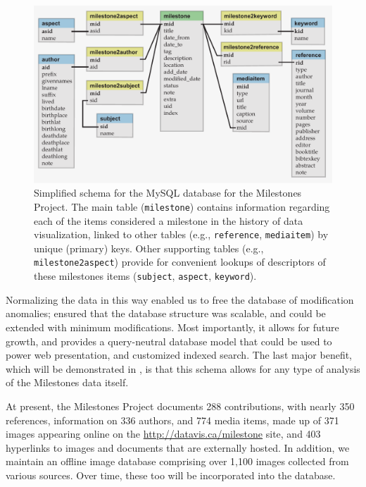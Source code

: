 \begin{figure}[!htb]
  \centering
  \includegraphics[width=\textwidth,clip]{fig/datavis-schema-3}
  \caption{Simplified schema for the MySQL database for the Milestones Project. 
  The main table (\texttt{milestone}) contains information regarding each of the items 
  considered a milestone in the history of data visualization, linked to other 
  tables (e.g., \texttt{reference}, \texttt{mediaitem}) by unique (primary) keys. 
  Other supporting tables (e.g., \texttt{milestone2aspect}) provide for 
  convenient lookups of descriptors of these milestones items (\texttt{subject}, 
  \texttt{aspect}, \texttt{keyword}).
  }
  \label{fig:datavis-schema-2}
\end{figure}

Normalizing the data in this way enabled us to free the database of 
modification anomalies; ensured that the database structure was scalable, and 
could be extended with minimum modifications. 
Most importantly, it allows for 
future growth, and provides a query-neutral database model \citep{Codd:1971} 
that could be used to power web presentation, and customized indexed search.
The last major benefit, which will be demonstrated in , is 
that this schema allows for any type of analysis of the Milestones data itself.

At present, the Milestones Project documents 288 contributions, with nearly 350 
references, information on 336 authors, and 774 media items, made up of 371 
images appearing online on the \url{http://datavis.ca/milestone} site, and 403 
hyperlinks to images and documents that are externally hosted. 
In addition, we 
maintain an offline image database comprising over 1,100 images collected from 
various sources. 
Over time, these too will be incorporated into the database.


